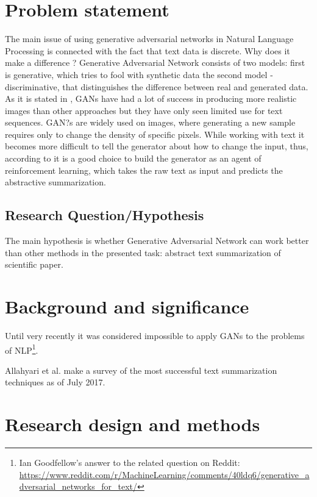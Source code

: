 \documentclass[sigplan]{acmart}
\begin{document}
\section{Problem statement}

The main issue of using generative adversarial networks in Natural Language Processing is connected with the fact that text data is discrete. Why does it make a difference ?
Generative Adversarial Network consists of two models: first is generative, which tries to fool with synthetic data the second model - discriminative, that distinguishes the difference between real and generated data. As it is stated in \cite{fedus-18}, GANs have had a lot of success in producing more realistic images than other approaches but they have only seen limited use for text sequences. 
GAN?s are widely used on images, where generating a new sample requires only to change the density of specific pixels. While working with text it becomes more difficult to tell the generator about how to change the input, thus, according to \cite{liu-17} it is a good choice to build the generator as an agent of reinforcement learning, which takes the raw text as input and predicts the abstractive summarization.

\subsection{Research Question/Hypothesis}
The main hypothesis is whether Generative Adversarial Network can work better than other methods in the presented task: abstract text summarization of scientific paper. 

\section{Background and significance}

Until very recently it was considered impossible to apply GANs to the problems of NLP\footnote{Ian Goodfellow's answer to the related question on Reddit: \url{https://www.reddit.com/r/MachineLearning/comments/40ldq6/generative_adversarial_networks_for_text/}}. 

Allahyari et al.\cite{allahyari-17} make a survey of the most successful text summarization techniques as of July 2017.

\section{Research design and methods}
\end{document}
